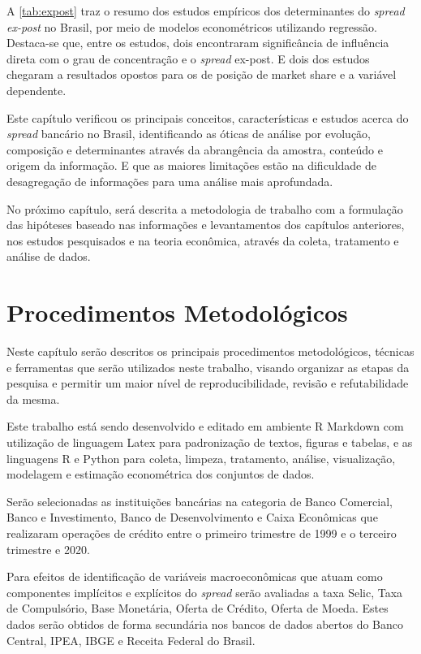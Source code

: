 \documentclass[12pt,12pt,openright,oneside,a4paper,chapter=TITLE,section=TITLE,subsection=TITLE,subsubsection=TITLE,english,french,spanish,portugues,sumario=tradicional]{abntex2}
\begin{document}
A \autoref{tab:expost} traz o resumo dos estudos empíricos dos determinantes do
\emph{spread ex-post} no Brasil, por meio de modelos econométricos utilizando
regressão. Destaca-se que, entre os estudos, dois encontraram significância de
influência direta com o grau de concentração e o \emph{spread} ex-post. E dois dos
estudos chegaram a resultados opostos para os de posição de market share e a
variável dependente.

Este capítulo verificou os principais conceitos, características e estudos
acerca do \emph{spread} bancário no Brasil, identificando as óticas de análise por
evolução, composição e determinantes através da abrangência da amostra,
conteúdo e origem da informação. E que as maiores limitações estão na
dificuldade de desagregação de informações para uma análise mais aprofundada.

No próximo capítulo, será descrita a metodologia de trabalho com a formulação
das hipóteses baseado nas informações e levantamentos dos capítulos anteriores,
nos estudos pesquisados e na teoria econômica, através da coleta, tratamento e
análise de dados.

\textual
\pagestyle{simple}

\chapter{Procedimentos Metodológicos}

Neste capítulo serão descritos os principais procedimentos metodológicos, técnicas e ferramentas que serão utilizados neste trabalho, visando organizar as etapas da pesquisa e permitir um maior nível de reproducibilidade, revisão e refutabilidade da mesma.

Este trabalho está sendo desenvolvido e editado em ambiente R Markdown com utilização de linguagem Latex para padronização de textos, figuras e tabelas, e as linguagens R e Python para coleta, limpeza, tratamento, análise, visualização, modelagem e estimação econométrica dos conjuntos de dados.

Serão selecionadas as instituições bancárias na categoria de Banco Comercial, Banco e Investimento, Banco de Desenvolvimento e Caixa Econômicas que realizaram operações de crédito entre o primeiro trimestre de 1999 e o terceiro trimestre e 2020.

Para efeitos de identificação de variáveis macroeconômicas que atuam como componentes implícitos e explícitos do \emph{spread} serão avaliadas a taxa Selic, Taxa de Compulsório, Base Monetária, Oferta de Crédito, Oferta de Moeda. Estes dados serão obtidos de forma secundária nos bancos de dados abertos do Banco Central, IPEA, IBGE e Receita Federal do Brasil.
\end{document}
